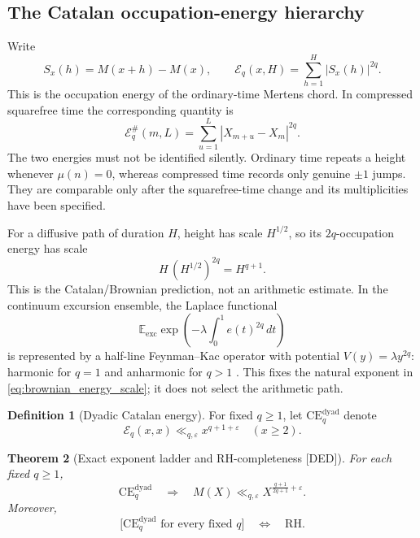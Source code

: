 \documentclass[11pt]{amsart}
\numberwithin{equation}{section}
\theoremstyle{plain}
\newtheorem{theorem}{Theorem}[section]
\theoremstyle{definition}
\newtheorem{definition}[theorem]{Definition}
\theoremstyle{remark}
\newcommand{\Mob}{\mu}
\newcommand{\Mert}{M}
\newcommand{\eps}{\varepsilon}
\begin{document}
\subsection{The Catalan occupation-energy hierarchy}
\label{subsec:catalan_energy_hierarchy}

Write
\begin{equation}
 S_x(h)=\Mert(x+h)-\Mert(x),
 \qquad
 \mathcal E_q(x,H)=\sum_{h=1}^{H}|S_x(h)|^{2q}.
\label{eq:ordinary_catalan_energy}
\end{equation}
This is the occupation energy of the ordinary-time Mertens chord.  In
compressed squarefree time the corresponding quantity is
\begin{equation}
 \mathcal E_q^\#(m,L)
 =\sum_{u=1}^{L}|X_{m+u}-X_m|^{2q}.
\label{eq:compressed_catalan_energy}
\end{equation}
The two energies must not be identified silently.  Ordinary time repeats a
height whenever $\Mob(n)=0$, whereas compressed time records only genuine
$\pm1$ jumps.  They are comparable only after the squarefree-time change and
its multiplicities have been specified.

For a diffusive path of duration $H$, height has scale $H^{1/2}$, so its
$2q$-occupation energy has scale
\begin{equation}
 H\,(H^{1/2})^{2q}=H^{q+1}.
\label{eq:brownian_energy_scale}
\end{equation}
This is the Catalan/Brownian prediction, not an arithmetic estimate.  In the
continuum excursion ensemble, the Laplace functional
\begin{equation}
 \mathbb E_{\mathrm{exc}}
 \exp\!\left(-\lambda\int_0^1 e(t)^{2q}\,dt\right)
\label{eq:feynman_kac_excursion}
\end{equation}
is represented by a half-line Feynman--Kac operator with potential
$V(y)=\lambda y^{2q}$: harmonic for $q=1$ and anharmonic for $q>1$
\cite{Majumdar2005}.  This fixes the natural exponent in
\eqref{eq:brownian_energy_scale}; it does not select the arithmetic path.

\begin{definition}[Dyadic Catalan energy]
\label{def:dyadic_ce}
For fixed $q\geq1$, let $\mathrm{CE}^{\mathrm{dyad}}_q$ denote
\begin{equation}
 \boxed{\;
 \mathcal E_q(x,x)\ll_{q,\eps}x^{q+1+\eps}
 \quad(x\geq2).\;}
\label{eq:dyadic_ce}
\end{equation}
\end{definition}

\begin{theorem}[Exact exponent ladder and RH-completeness \textnormal{[DED]}]
\label{thm:dyadic_energy_ladder}
For each fixed $q\geq1$,
\begin{equation}
 \mathrm{CE}^{\mathrm{dyad}}_q
 \quad\Longrightarrow\quad
 \Mert(X)\ll_{q,\eps}
 X^{\frac{q+1}{2q+1}+\eps}.
\label{eq:dyadic_exponent_ladder}
\end{equation}
Moreover,
\begin{equation}
 \boxed{\;
 \bigl[\mathrm{CE}^{\mathrm{dyad}}_q
       \text{ for every fixed }q\bigr]
 \quad\Longleftrightarrow\quad
 \mathrm{RH}.\;}
\label{eq:dyadic_ce_equiv_rh}
\end{equation}
\end{theorem}
\end{document}
